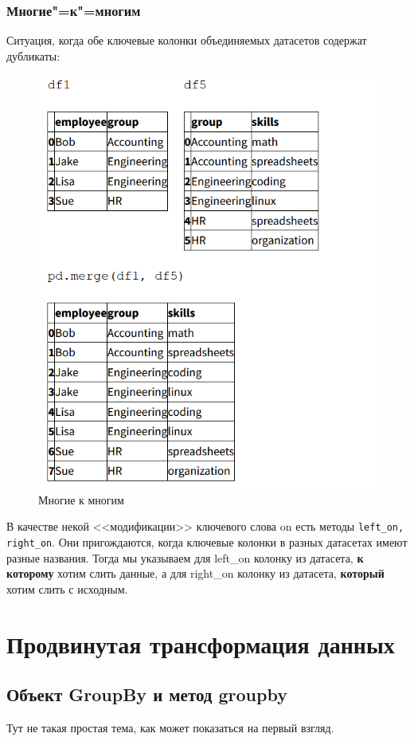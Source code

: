 \documentclass{article}
\begin{document}
\subsubsection*{Многие"=к"=многим}
Ситуация, когда обе ключевые колонки объединяемых датасетов содержат дубликаты:
\begin{figure}[H]
    \centering
    \includegraphics[width=0.52\linewidth]{merge_manytomany.png}
    \caption{Многие к многим}
    \label{fig:enter-label}
\end{figure}

В качестве некой <<модификации>> ключевого слова on есть методы \texttt{left_on, right_on}. Они пригождаются, когда ключевые колонки в разных датасетах имеют разные названия. Тогда мы указываем для left\_on колонку из датасета, \textbf{к которому} хотим слить данные, а для right\_on колонку из датасета, \textbf{который} хотим слить с исходным.
\section*{Продвинутая трансформация данных}
\subsection*{Объект GroupBy и метод groupby}
Тут не такая простая тема, как может показаться на первый взгляд.
\end{document}
